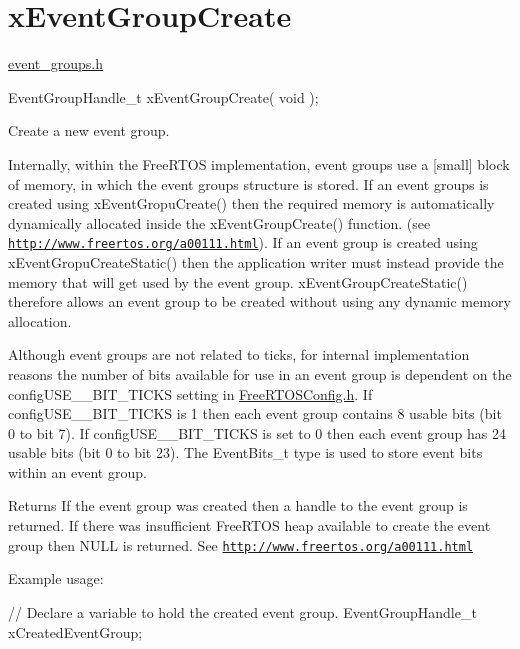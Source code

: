 \hypertarget{group__x_event_group_create}{}\section{x\+Event\+Group\+Create}
\label{group__x_event_group_create}
\hyperlink{event__groups_8h_source}{event\+\_\+groups.\+h} 
\begin{DoxyPre}
EventGroupHandle\_t xEventGroupCreate( void );
\end{DoxyPre}


Create a new event group.

Internally, within the Free\+R\+T\+OS implementation, event groups use a \mbox{[}small\mbox{]} block of memory, in which the event group\textquotesingle{}s structure is stored. If an event groups is created using x\+Event\+Gropu\+Create() then the required memory is automatically dynamically allocated inside the x\+Event\+Group\+Create() function. (see \href{http://www.freertos.org/a00111.html}{\tt http\+://www.\+freertos.\+org/a00111.\+html}). If an event group is created using x\+Event\+Gropu\+Create\+Static() then the application writer must instead provide the memory that will get used by the event group. x\+Event\+Group\+Create\+Static() therefore allows an event group to be created without using any dynamic memory allocation.

Although event groups are not related to ticks, for internal implementation reasons the number of bits available for use in an event group is dependent on the config\+U\+S\+E\+\_\+\_\+\+B\+I\+T\+\_\+\+T\+I\+C\+KS setting in \hyperlink{_free_r_t_o_s_config_8h_source}{Free\+R\+T\+O\+S\+Config.\+h}. If config\+U\+S\+E\+\_\+\_\+\+B\+I\+T\+\_\+\+T\+I\+C\+KS is 1 then each event group contains 8 usable bits (bit 0 to bit 7). If config\+U\+S\+E\+\_\+\_\+\+B\+I\+T\+\_\+\+T\+I\+C\+KS is set to 0 then each event group has 24 usable bits (bit 0 to bit 23). The Event\+Bits\+\_\+t type is used to store event bits within an event group.

\begin{DoxyReturn}{Returns}
If the event group was created then a handle to the event group is returned. If there was insufficient Free\+R\+T\+OS heap available to create the event group then N\+U\+LL is returned. See \href{http://www.freertos.org/a00111.html}{\tt http\+://www.\+freertos.\+org/a00111.\+html}
\end{DoxyReturn}
Example usage\+: 
\begin{DoxyPre}
   // Declare a variable to hold the created event group.
   EventGroupHandle\_t xCreatedEventGroup;\end{DoxyPre}



